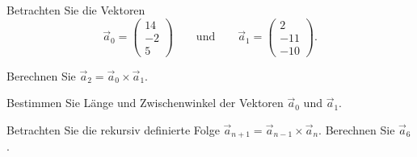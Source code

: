 %
%
%
%
Betrachten Sie die Vektoren
\[
\vec{a}_0
=
\begin{pmatrix} 14\\-2\\5 \end{pmatrix}
\qquad\text{und}\qquad
\vec{a}_1
=
\begin{pmatrix} 2\\-11\\-10 \end{pmatrix}.
\]
\begin{teilaufgaben}
\item
Berechnen Sie $\vec{a}_2 = \vec{a}_0\times\vec{a}_1$.
\item
Bestimmen Sie Länge und Zwischenwinkel der Vektoren $\vec{a}_0$ und
$\vec{a}_1$.
\item
Betrachten Sie die rekursiv definierte Folge
$\vec{a}_{n+1} = \vec{a}_{n-1} \times\vec{a}_n$.
Berechnen Sie $\vec{a}_{6}$.
\end{teilaufgaben}

